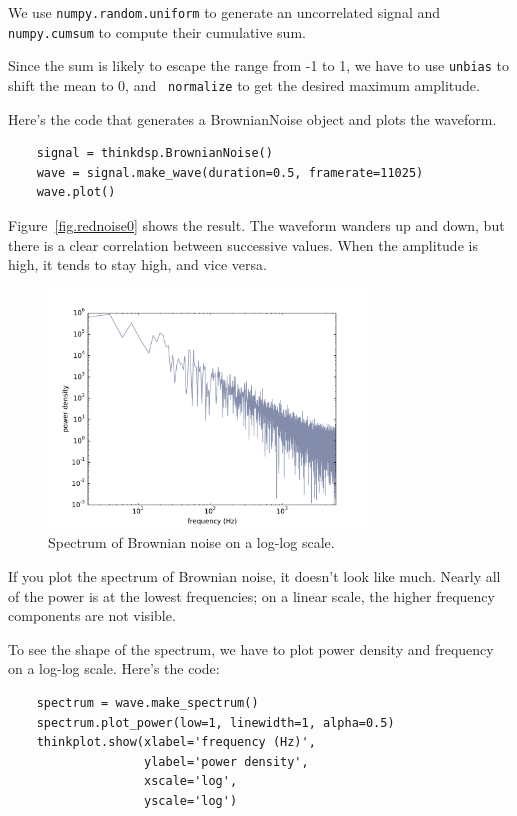 \documentclass[12pt]{book}
\begin{document}
We use {\tt numpy.random.uniform} to generate an uncorrelated signal
and {\tt numpy.cumsum} to compute their cumulative sum.

Since the sum is likely to escape the range from -1 to
1, we have to use {\tt unbias} to shift the mean to 0, and {\tt
  normalize} to get the desired maximum amplitude.

Here's the code that generates a BrownianNoise object and plots the
waveform.

\begin{verbatim}
    signal = thinkdsp.BrownianNoise()
    wave = signal.make_wave(duration=0.5, framerate=11025)
    wave.plot()
\end{verbatim}

Figure~\ref{fig.rednoise0} shows the result.  The waveform
wanders up and down, but there is a clear correlation between
successive values.  When the amplitude is high, it tends to stay
high, and vice versa.

\begin{figure}
\centerline{\includegraphics[height=2.5in]{figs/rednoise3.pdf}}
\caption{Spectrum of Brownian noise on a log-log scale.}
\label{fig.rednoise3}
\end{figure}

If you plot the spectrum of Brownian noise, it doesn't look like
much.  Nearly all of the power is at the lowest frequencies; on a
linear scale, the higher frequency components are not visible.

To see the shape of the spectrum, we have to plot power density
and frequency on a log-log scale.  Here's the code:

\begin{verbatim}
    spectrum = wave.make_spectrum()
    spectrum.plot_power(low=1, linewidth=1, alpha=0.5)
    thinkplot.show(xlabel='frequency (Hz)',
                   ylabel='power density',
                   xscale='log',
                   yscale='log')
\end{verbatim}
\end{document}
